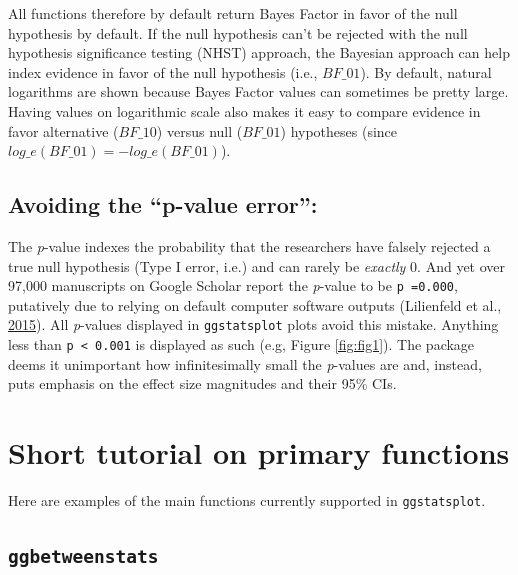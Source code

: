 \documentclass[]{article}
\begin{document}
All functions therefore by default return Bayes Factor
in favor of the null hypothesis by default. If the null hypothesis can't be
rejected with the null hypothesis significance testing (NHST) approach, the
Bayesian approach can help index evidence in favor of the null hypothesis (i.e.,
\(BF\_{01}\)). By default, natural logarithms are shown because Bayes Factor
values can sometimes be pretty large. Having values on logarithmic scale also
makes it easy to compare evidence in favor alternative (\(BF\_{10}\)) versus null
(\(BF\_{01}\)) hypotheses (since \(log\_{e}(BF\_{01}) = - log\_{e}(BF\_{01})\)).

\hypertarget{avoiding-the-p-value-error}{%
\subsection{\texorpdfstring{Avoiding the \textbf{``p-value error''}:}{Avoiding the ``p-value error'':}}\label{avoiding-the-p-value-error}}

The \emph{p}-value indexes the probability that the researchers have falsely rejected
a true null hypothesis (Type I error, i.e.) and can rarely be \emph{exactly} 0. And
yet over 97,000 manuscripts on Google Scholar report the \emph{p}-value to be \texttt{p\ =0.000},
putatively due to relying on default computer software outputs
(Lilienfeld et al., \protect\hyperlink{ref-lilienfeldFiftyPsychologicalPsychiatric2015}{2015}). All \emph{p}-values displayed in
\texttt{ggstatsplot} plots avoid this mistake. Anything less than \texttt{p\ \textless{}\ 0.001} is
displayed as such (e.g, Figure \ref{fig:fig1}). The package deems it unimportant how
infinitesimally small the \emph{p}-values are and, instead, puts emphasis on the
effect size magnitudes and their 95\% CIs.

\newpage

\hypertarget{short-tutorial-on-primary-functions}{%
\section{Short tutorial on primary functions}\label{short-tutorial-on-primary-functions}}

Here are examples of the main functions currently supported in \texttt{ggstatsplot}.

\hypertarget{ggbetweenstats}{%
\subsection{\texorpdfstring{\texttt{ggbetweenstats}}{ggbetweenstats}}\label{ggbetweenstats}}
\end{document}
